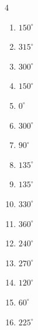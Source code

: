 \begin{multicols}{4}
\begin{enumerate}
  \item $\displaystyle 150^{\circ}$

  \item $\displaystyle 315^{\circ}$

  \item $\displaystyle 300^{\circ}$

  \item $\displaystyle 150^{\circ}$

  \item $\displaystyle 0^{\circ}$
        \phantom{$\displaystyle =0$}

  \item $\displaystyle 300^{\circ}$

  \item $\displaystyle 90^{\circ}$

  \item $\displaystyle 135^{\circ}$

  \item $\displaystyle 135^{\circ}$

  \item $\displaystyle 330^{\circ}$

  \item $\displaystyle 360^{\circ}$
        \phantom{$\displaystyle =2\pi$}

  \item $\displaystyle 240^{\circ}$

  \item $\displaystyle 270^{\circ}$

  \item $\displaystyle 120^{\circ}$

  \item $\displaystyle 60^{\circ}$

\columnbreak %

  \item $\displaystyle 225^{\circ}$


\end{enumerate}
\end{multicols}
